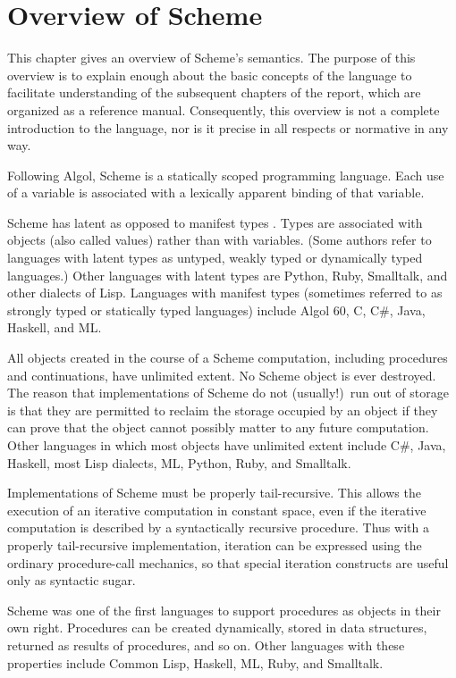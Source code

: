 \chapter{Overview of Scheme}
\label{semanticchapter}

This chapter gives an overview of Scheme's semantics.
The purpose of this overview is to explain
enough about the basic concepts of the language to facilitate
understanding of the subsequent chapters of the report, which are
organized as a reference manual.  Consequently, this overview is
not a complete introduction to the language, nor is it precise
in all respects or normative in any way.

\vest Following Algol, Scheme is a statically scoped programming
language.  Each use of a variable is associated with a lexically
apparent binding of that variable.

\vest Scheme has latent as opposed to manifest types
\cite{WaiteGoos}.  Types
are associated with objects (also called values) rather than
with variables.  (Some authors refer to languages with latent types as
untyped, weakly typed or dynamically typed languages.)  Other languages with
latent types are Python, Ruby, Smalltalk, and other dialects of Lisp.  Languages
with manifest types (sometimes referred to as strongly typed or
statically typed languages) include Algol 60, C, C\#, Java, Haskell, and ML.

\vest All objects created in the course of a Scheme computation, including
procedures and continuations, have unlimited extent.
No Scheme object is ever destroyed.  The reason that
implementations of Scheme do not (usually!)\ run out of storage is that
they are permitted to reclaim the storage occupied by an object if
they can prove that the object cannot possibly matter to any future
computation.  Other languages in which most objects have unlimited
extent include C\#, Java, Haskell, most Lisp dialects, ML, Python,
Ruby, and Smalltalk.

Implementations of Scheme must be properly tail-recursive.
This allows the execution of an iterative computation in constant space,
even if the iterative computation is described by a syntactically
recursive procedure.  Thus with a properly tail-recursive implementation,
iteration can be expressed using the ordinary procedure-call
mechanics, so that special iteration constructs are useful only as
syntactic sugar.

\vest Scheme was one of the first languages to support procedures as
objects in their own right.  Procedures can be created dynamically,
stored in data structures, returned as results of procedures, and so
on.  Other languages with these properties include Common Lisp,
Haskell, ML, Ruby, and Smalltalk.

